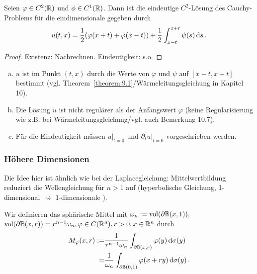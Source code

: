 \begin{theorem}
\label{theorem:9.2}
Seien $\varphi \in C^2(\mathbb{R})$ und $\phi \in C^1(\mathbb{R})$. Dann ist die eindeutige $C^2$-Lösung des Cauchy-Problems für die eindimensionale  gegeben durch
\[
	u(t,x) = \frac 1 2 (\varphi(x+t) + \varphi(x-t)) + \frac 1 2 \int_{x-t}^{x+t} \psi (s) \,\mathrm{d} s \, .
\]
\end{theorem}

\begin{proof}
Existenz: Nachrechnen. Eindeutigkeit: s.o.
\end{proof}

\begin{bem}
\label{bem:9.3}
\begin{enumerate}[(a)]
\item $u$ ist im Punkt $(t,x)$ durch die Werte von $\varphi$ und $\psi$ auf $[x-t,x+t]$ bestimmt (vgl. Theorem~\ref{theorem:9.1}/Wärmeleitungsgleichung in Kapitel 10).
\item Die Lösung $u$ ist nicht regulärer als der Anfangswert $\varphi$ (keine Regularisierung wie z.B. bei Wärmeleitungsgleichung/vgl. auch Bemerkung 10.7).
\item Für die Eindeutigkeit müssen $u|_{t = 0} $ und $\partial_t u|_{t = 0}$ vorgeschrieben werden.
\end{enumerate}
\end{bem}

\subsubsection{Höhere Dimensionen}

Die Idee hier ist ähnlich wie bei der Laplacegleichung: Mittelwertbildung reduziert die Wellengleichung für $n>1$ auf  (hyperbolische Gleichung, 1-dimensional $\rightsquigarrow$ 1-dimensionale ).

\begin{defi}
Wir definieren das sphärische Mittel mit $\omega_n := \operatorname{vol} (\partial \mathbb{B}(x,1)),$ $ \operatorname{vol} (\partial \mathbb{B} (x,r)) = r^{n-1} \omega_n, \varphi \in C(\mathbb{R}^n), r>0, x \in \mathbb{R}^n$ durch
\begin{align*}
	M_\varphi (x,r)  := & \frac 1{r^{n-1} \omega_n} \int_{\partial \mathbb{B} (x,r)} \varphi (y) \,\mathrm{d} \sigma(y) \\
	 = & \frac 1{\omega_n} \int_{\partial\mathbb{B}(0,1)} \varphi(x+ry) \,\mathrm{d} \sigma(y) \, .
\end{align*}
\end{defi}

